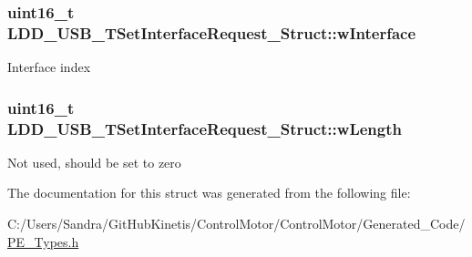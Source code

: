 \subsubsection[{\texorpdfstring{w\+Interface}{wInterface}}]{\setlength{\rightskip}{0pt plus 5cm}uint16\+\_\+t L\+D\+D\+\_\+\+U\+S\+B\+\_\+\+T\+Set\+Interface\+Request\+\_\+\+Struct\+::w\+Interface}\hypertarget{struct_l_d_d___u_s_b___t_set_interface_request___struct_a6554d6522c7dcbd0e96cbe945b1725de}{}\label{struct_l_d_d___u_s_b___t_set_interface_request___struct_a6554d6522c7dcbd0e96cbe945b1725de}
Interface index 
\subsubsection[{\texorpdfstring{w\+Length}{wLength}}]{\setlength{\rightskip}{0pt plus 5cm}uint16\+\_\+t L\+D\+D\+\_\+\+U\+S\+B\+\_\+\+T\+Set\+Interface\+Request\+\_\+\+Struct\+::w\+Length}\hypertarget{struct_l_d_d___u_s_b___t_set_interface_request___struct_a7ccdd1f214e5cebbc10cde359ccba50e}{}\label{struct_l_d_d___u_s_b___t_set_interface_request___struct_a7ccdd1f214e5cebbc10cde359ccba50e}
Not used, should be set to zero 

The documentation for this struct was generated from the following file\+:\begin{DoxyCompactItemize}
\item 
C\+:/\+Users/\+Sandra/\+Git\+Hub\+Kinetis/\+Control\+Motor/\+Control\+Motor/\+Generated\+\_\+\+Code/\hyperlink{_p_e___types_8h}{P\+E\+\_\+\+Types.\+h}\end{DoxyCompactItemize}
